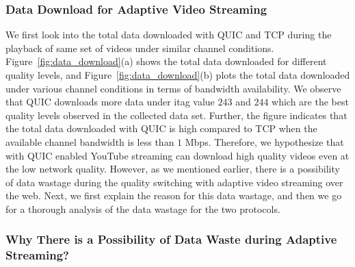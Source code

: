 \subsubsection{Data Download for Adaptive Video Streaming}
We first look into the total data downloaded with QUIC and TCP during the playback of same set of videos under similar channel conditions. Figure~\ref{fig:data_download}(a) shows the total data downloaded for different quality levels, and Figure~\ref{fig:data_download}(b) plots the total data downloaded under various channel conditions in terms of bandwidth availability. We observe that QUIC downloads more data under itag value $243$ and $244$ which are the best quality levels observed in the collected data set. 
Further, the figure indicates that the total data downloaded with QUIC is high compared to TCP when the available channel bandwidth is less than $1$ Mbps. Therefore, we hypothesize that with QUIC enabled YouTube streaming can download high quality videos even at the low network quality. 
However, as we mentioned earlier, there is a possibility of data wastage during the quality switching with adaptive video streaming over the web. Next, we first explain the reason for this data wastage, and then we go for a thorough analysis of the data wastage for the two protocols. 





\subsubsection{Why There is a Possibility of Data Waste during Adaptive Streaming?}


